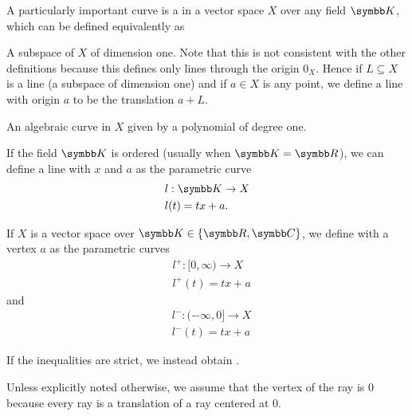 \begin{definition}\label{def:geometric_line}
  A particularly important curve is a  in a vector space \( X \) over any field \( \BK \), which can be defined equivalently as

  \begin{defenum}
     A subspace of \( X \) of dimension one. Note that this is not consistent with the other definitions because this defines only lines through the origin \( 0_X \). Hence if \( L \subseteq X \) is a line (a subspace of dimension one) and if \( a \in X \) is any point, we define a line with origin \( a \) to be the translation \( a + L \).

     An algebraic curve in \( X \) given by a polynomial of degree one.

     If the field \( \BK \) is ordered (usually when \( \BK = \BR \)), we can define a line with  \( x \) and  \( a \) as the parametric curve
    \begin{align*}
      &l: \BK \to X \\
      &l(t) = tx + a.
    \end{align*}
  \end{defenum}
\end{definition}

\begin{definition}\label{def:geometric_ray}
  If \( X \) is a vector space over \( \BK \in \{ \BR, \BC \} \), we define  with a vertex \( a \) as the parametric curves
  \begin{align*}
    &l^+: [0, \infty) \to X \\
    &l^+(t) = tx + a
  \end{align*}
  and
  \begin{align*}
    &l^-: (-\infty, 0] \to X \\
    &l^-(t) = tx + a
  \end{align*}

  If the inequalities are strict, we instead obtain .

  Unless explicitly noted otherwise, we assume that the vertex of the ray is \( 0 \) because every ray is a translation of a ray centered at \( 0 \).
\end{definition}

